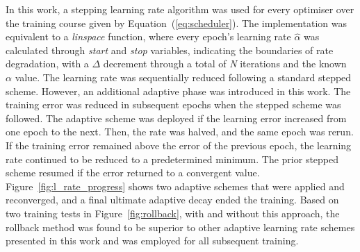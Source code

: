 In this work, a stepping learning rate algorithm was used for every optimiser over the training course given by Equation~(\ref{eq:scheduler}).
The implementation was equivalent to a \textit{linspace} function, where every epoch's learning rate $\hat{\alpha}$ was calculated through \textit{start} and \textit{stop} variables, indicating the boundaries of rate degradation, with a $\Delta$ decrement through a total of \textit{N} iterations and the known $\alpha$ value.
%
The learning rate was sequentially reduced following a standard stepped scheme.
However, an additional adaptive phase was introduced in this work.
The training error was reduced in subsequent epochs when the stepped scheme was followed. %
The adaptive scheme was deployed if the learning error increased from one epoch to the next.
Then, the rate was halved, and the same epoch was rerun.
If the training error remained above the error of the previous epoch, the learning rate continued to be reduced to a predetermined minimum.
The prior stepped scheme resumed if the error returned to a convergent value.
Figure~\ref{fig:l_rate_progress} shows two adaptive schemes that were applied and reconverged, and a final ultimate adaptive decay ended the training.
%
Based on two training tests in Figure~\ref{fig:rollback}, with and without this approach, the rollback method was found to be superior to other adaptive learning rate schemes presented in this work and was employed for all subsequent training.
%

